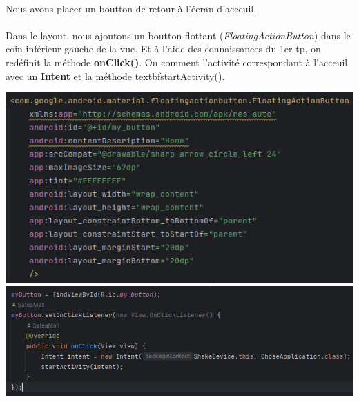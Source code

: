 \documentclass[a4paper]{article}
\begin{document}
\begin{multicols}{2}
                \paragraph{}
                    Nous avons placer un boutton de retour à l'écran d'acceuil.
                    
                \paragraph{}
                    Dans le layout, nous ajoutons un boutton flottant (\emph{FloatingActionButton}) dans le coin inférieur gauche de la vue.
                    Et à l'aide des connaissances du 1er tp, on redéfinit la méthode \textbf{onClick()}. On comment l'activité correspondant à l'acceuil avec un \textbf{Intent} et la méthode textbf{startActivity()}.

                    \noindent\includegraphics[width=.49\textwidth]{button/boutton}
                    \includegraphics[width=.49\textwidth]{button/onClick}

    \end{multicols}
\end{document}
